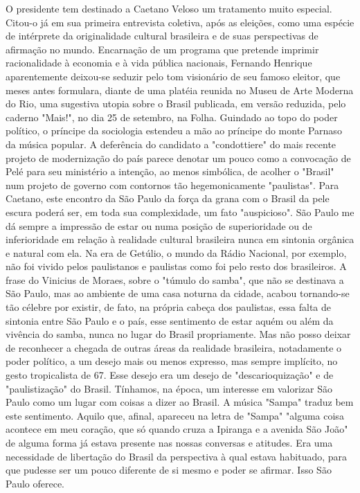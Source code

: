 O presidente tem destinado a Caetano Veloso um tratamento muito especial. Citou-o já em sua primeira entrevista coletiva, após as eleições, como uma espécie de intérprete da originalidade cultural brasileira e de suas perspectivas de afirmação no mundo.
Encarnação de um programa que pretende imprimir racionalidade à economia e à vida pública nacionais, Fernando Henrique aparentemente deixou-se seduzir pelo tom visionário de seu famoso eleitor, que meses antes formulara, diante de uma platéia reunida no Museu de Arte Moderna do Rio, uma sugestiva utopia sobre o Brasil publicada, em versão reduzida, pelo caderno "Mais!", no dia 25 de setembro, na Folha. Guindado ao topo do poder político, o príncipe da sociologia estendeu a mão ao príncipe do monte Parnaso da música popular.
A deferência do candidato a "condottiere" do mais recente projeto de modernização do país parece denotar um pouco como a convocação de Pelé para seu ministério a intenção, ao menos simbólica, de acolher o "Brasil" num projeto de governo com contornos tão hegemonicamente "paulistas".
Para Caetano, este encontro da São Paulo da força da grana com o Brasil da pele escura poderá ser, em toda sua complexidade, um fato "auspicioso".
São Paulo me dá sempre a impressão de estar ou numa posição de superioridade ou de inferioridade em relação à realidade cultural brasileira nunca em sintonia orgânica e natural com ela. Na era de Getúlio, o mundo da Rádio Nacional, por exemplo, não foi vivido pelos paulistanos e paulistas como foi pelo resto dos brasileiros. A frase do Vinicius de Moraes, sobre o "túmulo do samba", que não se destinava a São Paulo, mas ao ambiente de uma casa noturna da cidade, acabou tornando-se tão célebre por existir, de fato, na própria cabeça dos paulistas, essa falta de sintonia entre São Paulo e o país, esse sentimento de estar aquém ou além da vivência do samba, nunca no lugar do Brasil propriamente.
Mas não posso deixar de reconhecer a chegada de outras áreas da realidade brasileira, notadamente o poder político, a um desejo mais ou menos expresso, mas sempre implícito, no gesto tropicalista de 67. Esse desejo era um desejo de "descarioquização" e de "paulistização" do Brasil. Tínhamos, na época, um interesse em valorizar São Paulo como um lugar com coisas a dizer ao Brasil.
A música "Sampa" traduz bem este sentimento.
Aquilo que, afinal, apareceu na letra de "Sampa" "alguma coisa acontece em meu coração, que só quando cruza a Ipiranga e a avenida São João" de alguma forma já estava presente nas nossas conversas e atitudes. Era uma necessidade de libertação do Brasil da perspectiva à qual estava habituado, para que pudesse ser um pouco diferente de si mesmo e poder se afirmar. Isso São Paulo oferece.
